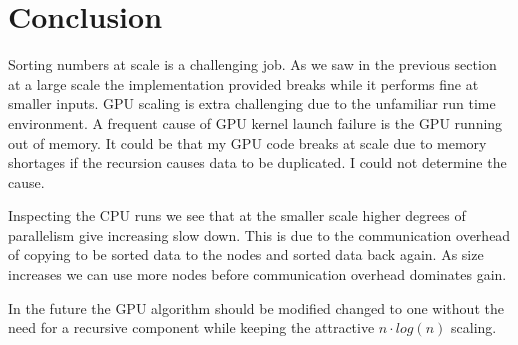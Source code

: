 \documentclass[lang=en, hanging-titles=true]{skrapport}
\begin{document}
\section{Conclusion}
Sorting numbers at scale is a challenging job. As we saw in the previous section at a large scale the implementation provided breaks while it performs fine at smaller inputs. GPU scaling is extra challenging due to the unfamiliar run time environment. A frequent cause of GPU kernel launch failure is the GPU running out of memory. It could be that my GPU code breaks at scale due to memory shortages if the recursion causes data to be duplicated. I could not determine the cause. 

Inspecting the CPU runs we see that at the smaller scale higher degrees of parallelism give increasing slow down. This is due to the communication overhead of copying to be sorted data to the nodes and sorted data back again. As size increases we can use more nodes before communication overhead dominates gain.

In the future the GPU algorithm should be modified changed to one without the need for a recursive component while keeping the attractive $n\cdot log(n)$ scaling.

%

% 
\end{document}
